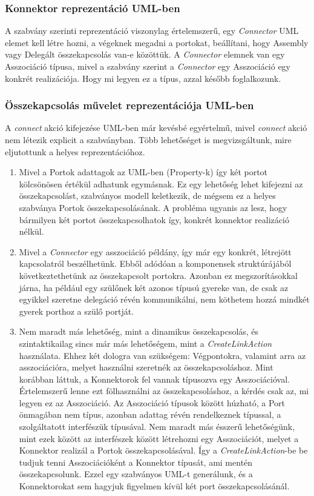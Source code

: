 \documentclass[a4paper,12pt]{report}
\begin{document}
\subsubsection{Konnektor reprezentáció UML-ben}
A szabvány szerinti reprezentáció viszonylag értelemszerű, egy \textit{Connector} UML elemet kell létre hozni, a végeknek megadni a portokat, beállítani, hogy Assembly vagy Delegált összekapcsolás van-e közöttük. A \textit{Connector} elemnek van egy Asszociáció típusa, mivel a szabvány szerint a \textit{Connector} egy Asszociáció egy konkrét realizációja. Hogy mi legyen ez a típus, azzal később foglalkozunk.

\subsubsection{Összekapcsolás művelet reprezentációja UML-ben}
A \textit{connect} akció kifejezése UML-ben már kevésbé egyértelmű, mivel \textit{connect} akció nem létezik explicit a szabványban. Több lehetőséget is megvizsgáltunk, mire eljutottunk a helyes reprezentációhoz.
\begin{enumerate}
\item Mivel a Portok adattagok az UML-ben (Property-k) így két portot kölcsönösen értékül adhatunk egymásnak. Ez egy lehetőség lehet kifejezni az összekapcsolást, szabványos modell keletkezik, de mégsem ez a helyes szabványa Portok összekapcsolásának. A probléma ugyanis az lesz, hogy bármilyen két portot összekapcsolhatok így, konkrét konnektor realizáció nélkül.
\item Mivel a \textit{Connector} egy asszociáció példány, így már egy konkrét, létrejött kapcsolatról beszélhetünk. Ebből adódóan a komponensek struktúrájából következtethetünk az összekapcsolt portokra. Azonban ez megszorításokkal járna, ha például egy szülőnek két azonos típusú gyereke van, de csak az egyikkel szeretne delegáció révén kommunikálni, nem köthetem hozzá mindkét gyerek porthoz a szülő portját.
\item Nem maradt más lehetőség, mint a dinamikus összekapcsolás, és szintaktikailag sincs már más lehetőségem, mint a \textit{CreateLinkAction} használata. Ehhez két dologra van szükségem: Végpontokra, valamint arra az asszociációra, melyet használni szeretnék az összekapcsoláshoz. Mint korábban láttuk, a Konnektorok fel vannak típusozva egy Asszociációval. Értelemszerű lenne ezt fölhasználni az összekapcsoláshoz, a kérdés csak az, mi legyen ez az Asszociáció. Az Asszociáció típusok között húzható, a Port önmagában nem típus, azonban adattag révén rendelkeznek típussal, a szolgáltatott interfészük típusával. Nem maradt más ésszerű lehetőségünk, mint ezek között az interfészek között létrehozni egy Asszociációt, melyet a Konnektor realizál a Portok összekapcsolásával. Így a \textit{CreateLinkAction}-be be tudjuk tenni Asszociációként a Konnektor típusát, ami mentén összekapcsolunk. Ezzel egy szabványos UML-t generálunk, és a Konnektorokat sem hagyjuk figyelmen kívül két port összekapcsolásánál.
\end{enumerate}
\end{document}
